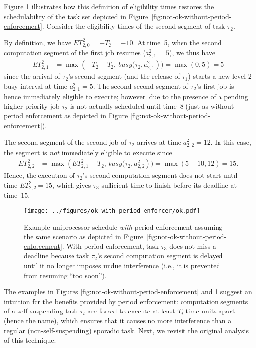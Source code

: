 Figure \ref{fig:ok-with-period-enforcement} illustrates how this definition of eligibility times restores the schedulability of the task set depicted in Figure~\ref{fig:not-ok-without-period-enforcement}. Consider the eligibility times of the second segment of task $\tau_2$.

By definition, we have $ET_{2,0}^2 = -T_2 = -10$. At time~5, when the second computation segment of the first job resumes ($a_{2,1}^2 = 5$), we thus have
\begin{align*}
	ET_{2,1}^2 & = \max\left(-T_2 + T_2,\ \mathit{busy}(\tau_2, a_{2,1}^2\right) ) = \max(0, 5) = 5
\end{align*}
since the arrival of $\tau_2$'s second segment (and the release of $\tau_1$) starts a new level-2 busy interval at time $a_{2,1}^2 = 5$. The second second segment of $\tau_2$'s first job is hence immediately eligible to execute; however, due to the presence of a pending higher-priority job $\tau_2$ is not actually scheduled until time~8 (just as without period enforcement as depicted in Figure \ref{fig:not-ok-without-period-enforcement}).

The second segment of the second job of $\tau_2$ arrives at time $a_{2,2}^2 = 12$. In this case, the segment is \emph{not} immediately eligible to execute since
\begin{align*}
	ET_{2,2}^2 & = \max\left(ET_{2,1}^2 + T_2,\ \mathit{busy}(\tau_2, a_{2,2}^2\right) ) = \max(5 + 10, 12) = 15.
\end{align*}
Hence, the execution of $\tau_2$'s second computation segment does not start until time $ET_{2,2}^2 = 15$, which gives $\tau_3$ sufficient time to finish before its deadline at time~$15$.


\ifpaper
\begin{figure}[t]
  \centering
  \texttt{[image: ../figures/ok-with-period-enforcer/ok.pdf]}
  \caption{Example uniprocessor schedule \emph{with} period enforcement assuming the same scenario as depicted in Figure~\ref{fig:not-ok-without-period-enforcement}. With period enforcement, task $\tau_3$ does not miss a deadline because task $\tau_2$'s second computation segment is delayed until it no longer imposes undue interference (i.e., it is prevented from resuming ``too soon'').}
  \label{fig:ok-with-period-enforcement}
  \end{figure}
\fi

The examples in Figures \ref{fig:not-ok-without-period-enforcement} and \ref{fig:ok-with-period-enforcement} suggest an intuition for the benefits provided by period enforcement: computation segments of a self-suspending task $\tau_i$ are forced to execute at least $T_i$ time units apart (hence the name), which ensures that it causes no more interference than a regular (non-self-suspending) sporadic task. Next, we revisit the original analysis of this technique.


